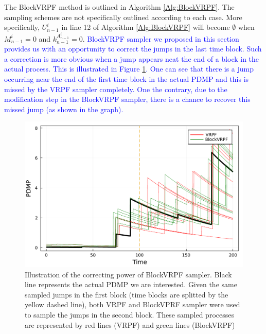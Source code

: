 \documentclass[12pt,a4paper]{article}
\begin{document}
The BlockVRPF method is outlined in Algorithm \ref{Alg:BlockVRPF}. The sampling schemes are not specifically outlined according to each case. More specifically, $U_{n-1}^i$ in line 12 of Algorithm \ref{Alg:BlockVRPF} will become $\emptyset$ when $M_{n-1}^i = 0$ and $k_{n-1}^{A_{n-1}^i} = 0$. \textcolor{blue}
{BlockVRPF sampler we proposed in this section provides us with an opportunity to correct the jumps in the last time block. Such a correction is more obvious when a jump appears neat the end of a block in the actual process. This is illustrated in Figure \ref{BlockSMC_correction_illustration}. One can see that there is a jump occurring near the end of the first time block in the actual PDMP and this is missed by the VRPF sampler completely. One the contrary, due to the modification step in the BlockVRPF sampler, there is a chance to recover this missed jump (as shown in the graph).}

\begin{figure}[htb!]
    \centering
    \includegraphics[width=\textwidth]{BlockVRPF_Illustration.pdf}
    \caption{Illustration of the correcting power of BlockVRPF sampler. Black line represents the actual PDMP we are interested. Given the same sampled jumps in the first block (time blocks are splitted by the yellow dashed line), both VRPF and BlockVPRF sampler were used to sample the jumps in the second block. These sampled processes are represented by red lines (VRPF) and green lines (BlockVRPF)}
    \label{BlockSMC_correction_illustration}
\end{figure}
\end{document}
